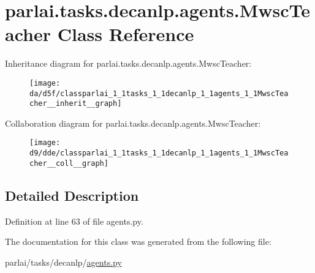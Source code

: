 \hypertarget{classparlai_1_1tasks_1_1decanlp_1_1agents_1_1MwscTeacher}{}\section{parlai.\+tasks.\+decanlp.\+agents.\+Mwsc\+Teacher Class Reference}
\label{classparlai_1_1tasks_1_1decanlp_1_1agents_1_1MwscTeacher}


Inheritance diagram for parlai.\+tasks.\+decanlp.\+agents.\+Mwsc\+Teacher\+:
\nopagebreak
\begin{figure}[H]
\begin{center}
\leavevmode
\texttt{[image: da/d5f/classparlai\_1\_1tasks\_1\_1decanlp\_1\_1agents\_1\_1MwscTeacher\_\_inherit\_\_graph]}
\end{center}
\end{figure}


Collaboration diagram for parlai.\+tasks.\+decanlp.\+agents.\+Mwsc\+Teacher\+:
\nopagebreak
\begin{figure}[H]
\begin{center}
\leavevmode
\texttt{[image: d9/dde/classparlai\_1\_1tasks\_1\_1decanlp\_1\_1agents\_1\_1MwscTeacher\_\_coll\_\_graph]}
\end{center}
\end{figure}


\subsection{Detailed Description}


Definition at line 63 of file agents.\+py.



The documentation for this class was generated from the following file\+:\begin{DoxyCompactItemize}
\item 
parlai/tasks/decanlp/\hyperlink{parlai_2tasks_2decanlp_2agents_8py}{agents.\+py}\end{DoxyCompactItemize}
